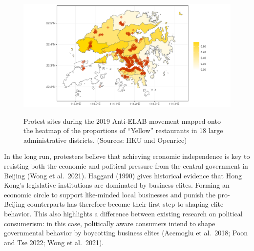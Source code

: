 \documentclass[letterpaper, 12pt]{article}
\begin{document}
\vspace{9pt}
\begin{figure}[h!]
\begin{center}
        \includegraphics[scale=0.8]{Visuals/protest-sites.pdf} 
        \caption{Protest sites during the 2019 Anti-ELAB movement mapped onto the heatmap of the proportions of ``Yellow'' restaurants in 18 large administrative districts. (Sources: HKU and Openrice)}
        \label{fig: protests}
\end{center}
\end{figure}


In the long run, protesters believe that achieving economic independence is key to resisting both the economic and political pressure from the central government in Beijing (Wong et al.\ 2021). Haggard (1990) gives historical evidence that Hong Kong's legislative institutions are dominated by business elites. Forming an economic circle to support like-minded local businesses and punish the pro-Beijing counterparts has therefore become their first step to shaping elite behavior. This also highlights a difference between existing research on political consumerism: in this case, politically aware consumers intend to shape governmental behavior by boycotting business elites (Acemoglu et al.\ 2018; Poon and Tse 2022; Wong et al.\ 2021).
\end{document}
